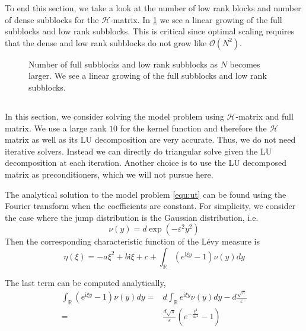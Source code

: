 \documentclass[10pt,a4paper]{article}
\newcommand{\ii}[0]{\mathrm{i}}
\newcommand{\RR}[0]{\mathbb{R}}
\theoremstyle{definition}
\begin{document}
To end this section, we take a look at the number of low rank blocks and number of dense subblocks for the $\mathcal{H}$-matrix. In \cref{fig:dense} we see a linear growing of the full subblocks and low rank subblocks. This is critical since optimal scaling requires that the dense and low rank subblocks do not grow like $\mathcal{O}(N^2)$. 

\begin{figure}[htpb]
\centering
\scalebox{0.6}{}
\caption{Number of full subblocks and low rank subblocks as $N$ becomes larger. We see a linear growing of the full subblocks and low rank subblocks.}
\label{fig:dense}
\end{figure}

\subsection{}

In this section, we consider solving the model problem using $\mathcal{H}$-matrix and full matrix. We use a large rank $10$ for the kernel function and therefore the $\mathcal{H}$ matrix as well as its LU decomposition are very accurate. Thus, we do not need iterative solvers. Instead we can directly do triangular solve given the LU decomposition at each iteration. Another choice is to use the LU decomposed matrix as preconditioners, which we will not pursue here.  

The analytical solution to the model problem \cref{equ:ut} can be found using the Fourier transform when the coefficients are constant. For simplicity, we consider the case where the jump distribution is the Gaussian distribution, i.e. 
\begin{equation}
	\nu(y) = d\exp(-\varepsilon^2 y^2)
\end{equation}
Then the corresponding characteristic function of the L\'evy measure is 
\begin{equation}
	\eta(\xi) = -a\xi^2 + b\ii \xi + c + \int_\RR (e^{\ii \xi y}-1)\nu(y)dy
\end{equation}

The last term can be computed analytically,
\begin{align}
	\int_{\RR} {({e^{\ii\xi y}} - 1)} \nu (y)dy =& d\int_{\RR} {{e^{\ii\xi y}}\nu (y)} dy - d\frac{{\sqrt \pi  }}{\varepsilon }\\
	 =&\frac{{ d\sqrt \pi  }}{\varepsilon }\left( {{e^{ - \frac{{{\xi ^2}}}{{4{\varepsilon ^2}}}}} - 1} \right)
\end{align}
\end{document}
